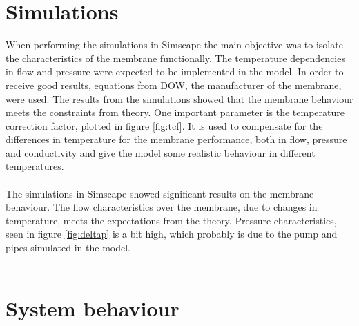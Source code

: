 \section{Simulations}
When performing the simulations in Simscape the main objective was to isolate the characteristics of the membrane functionally. The temperature dependencies in flow and pressure were expected to be implemented in the model. In order to receive good results, equations from DOW, the manufacturer of the membrane, were used. The results from the simulations showed that the membrane behaviour meets the constraints from theory. One important parameter is the temperature correction factor, plotted in figure \ref{fig:tcf}. It is used to compensate for the differences in temperature for the membrane performance, both in flow, pressure and conductivity and give the model some realistic behaviour in different temperatures. \\
\\
The simulations in Simscape showed significant results on the membrane behaviour. The flow characteristics over the membrane, due to changes in temperature, meets the expectations from the theory. Pressure characteristics, seen in figure \ref{fig:deltap} is a bit high, which probably is due to the pump and pipes simulated in the model. \\
\\


\section{System behaviour} 


